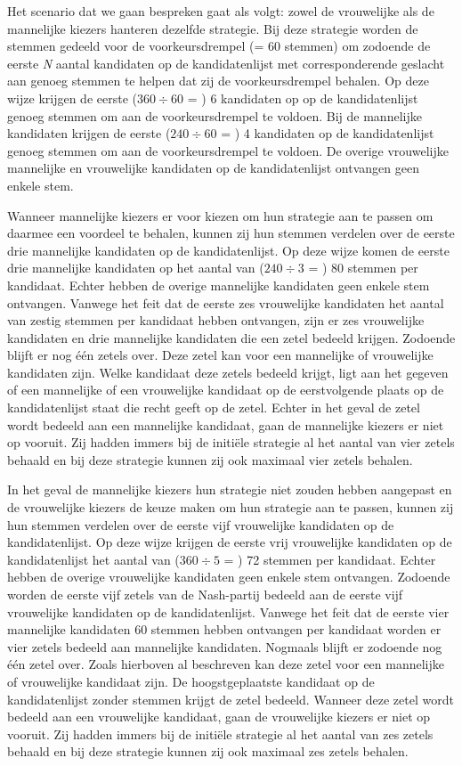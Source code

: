 Het scenario dat we gaan bespreken gaat als volgt: zowel de vrouwelijke als de mannelijke kiezers hanteren dezelfde strategie. Bij deze strategie worden de stemmen gedeeld voor de voorkeursdrempel (= 60 stemmen) om zodoende de eerste \textit{N} aantal kandidaten op de kandidatenlijst met corresponderende geslacht aan genoeg stemmen te helpen dat zij de voorkeursdrempel behalen. Op deze wijze krijgen de eerste ($360\div60$ = ) 6 kandidaten op op de kandidatenlijst genoeg stemmen om aan de voorkeursdrempel te voldoen. Bij de mannelijke kandidaten krijgen de eerste ($240\div60$ = ) 4 kandidaten op de kandidatenlijst genoeg stemmen om aan de voorkeursdrempel te voldoen. De overige vrouwelijke mannelijke en vrouwelijke kandidaten op de kandidatenlijst ontvangen geen enkele stem.

Wanneer mannelijke kiezers er voor kiezen om hun strategie aan te passen om daarmee een voordeel te behalen, kunnen zij hun stemmen verdelen over de eerste drie mannelijke kandidaten op de kandidatenlijst. Op deze wijze komen de eerste drie mannelijke kandidaten op het aantal van ($240\div3$ = ) 80 stemmen per kandidaat. Echter hebben de overige mannelijke kandidaten geen enkele stem ontvangen. Vanwege het feit dat de eerste zes vrouwelijke kandidaten het aantal van zestig stemmen per kandidaat hebben ontvangen, zijn er zes vrouwelijke kandidaten en drie mannelijke kandidaten die een zetel bedeeld krijgen. Zodoende blijft er nog één zetels over. Deze zetel kan voor een mannelijke of vrouwelijke kandidaten zijn. Welke kandidaat deze zetels bedeeld krijgt, ligt aan het gegeven of een mannelijke of een vrouwelijke kandidaat op de eerstvolgende plaats op de kandidatenlijst staat die recht geeft op de zetel. Echter in het geval de zetel wordt bedeeld aan een mannelijke kandidaat, gaan de mannelijke kiezers er niet op vooruit. Zij hadden immers bij de initi\"{e}le strategie al het aantal van vier zetels behaald en bij deze strategie kunnen zij ook maximaal vier zetels behalen. 

In het geval de mannelijke kiezers hun strategie niet zouden hebben aangepast en de vrouwelijke kiezers de keuze maken om hun strategie aan te passen, kunnen zij hun stemmen verdelen over de eerste vijf vrouwelijke kandidaten op de kandidatenlijst. Op deze wijze krijgen de eerste vrij vrouwelijke kandidaten op de kandidatenlijst het aantal van ($360\div5$ = ) 72 stemmen per kandidaat. Echter hebben de overige vrouwelijke kandidaten geen enkele stem ontvangen. Zodoende worden de eerste vijf zetels van de Nash-partij bedeeld aan de eerste vijf vrouwelijke kandidaten op de kandidatenlijst. Vanwege het feit dat de eerste vier mannelijke kandidaten 60 stemmen hebben ontvangen per kandidaat worden er vier zetels bedeeld aan mannelijke kandidaten. Nogmaals blijft er zodoende nog één zetel over. Zoals hierboven al beschreven kan deze zetel voor een mannelijke of vrouwelijke kandidaat zijn. De hoogstgeplaatste kandidaat op de kandidatenlijst zonder stemmen krijgt de zetel bedeeld. Wanneer deze zetel wordt bedeeld aan een vrouwelijke kandidaat, gaan de vrouwelijke kiezers er niet op vooruit. Zij hadden immers bij de initi\"{e}le strategie al het aantal van zes zetels behaald en bij deze strategie kunnen zij ook maximaal zes zetels behalen. 

